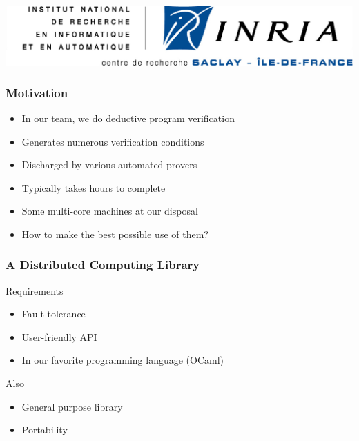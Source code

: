 \documentclass[xcolor=dvipsnames]{beamer}
\let\emph\alert
\begin{document}
\begin{frame}
\begin{center}
    \hspace{4mm}
    \includegraphics[scale=0.4]{inria-saclay.jpeg}
  \end{center}
\end{frame}


\begin{frame}\frametitle{Motivation}
  \begin{itemize}
  \item In our team, we do deductive program verification
  \item Generates numerous verification conditions
  \item Discharged by various automated provers
  \item Typically takes \emph{hours} to complete
  \end{itemize}
  \vspace{1cm}
  \begin{itemize}
  \item Some multi-core machines at our disposal
  \item How to make the best possible use of them?
  \end{itemize}
\end{frame}


\begin{frame}\frametitle {A Distributed Computing Library}
  Requirements
  \begin{itemize}
  \item Fault-tolerance
  \item User-friendly API
  \item In our favorite programming language (OCaml)
  \end{itemize}


\bigskip
Also
  \begin{itemize}
  \item General purpose library
  \item Portability
  \end{itemize}
\end{frame}
\end{document}
